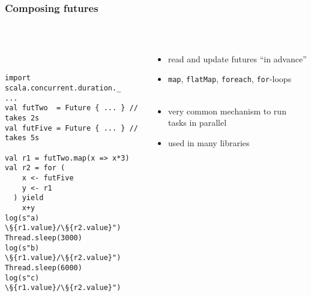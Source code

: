 \documentclass[aspectratio=169]{beamer}
\begin{document}
\begin{frame}[fragile]\frametitle{Composing futures}
~\\[-8mm]
\begin{columns}
\begin{column}{0.56\textwidth}
~\\
\begin{lstlisting}[emph={execute,sleep,log,Future,Try,Success,Failure,onComplete,Await,result,ready}]
import scala.concurrent.duration._
...
val futTwo  = Future { ... } // takes 2s
val futFive = Future { ... } // takes 5s

val r1 = futTwo.map(x => x*3)
val r2 = for (
    x <- futFive
    y <- r1
  ) yield 
    x+y
log(s"a) \§{r1.value}/\§{r2.value}")
Thread.sleep(3000)
log(s"b) \§{r1.value}/\§{r2.value}")
Thread.sleep(6000)
log(s"c) \§{r1.value}/\§{r2.value}")
\end{lstlisting}
\end{column}
\begin{column}{0.46\textwidth}
\begin{itemize}
  \item read and update futures ``in advance''
  \item \texttt{map}, \texttt{flatMap}, \texttt{foreach}, \texttt{for}-loops
  \\~\pause
  \item very common mechanism to run tasks in parallel
  \item used in many libraries
\end{itemize}
\end{column}
\end{columns}
\end{frame}
\end{document}
